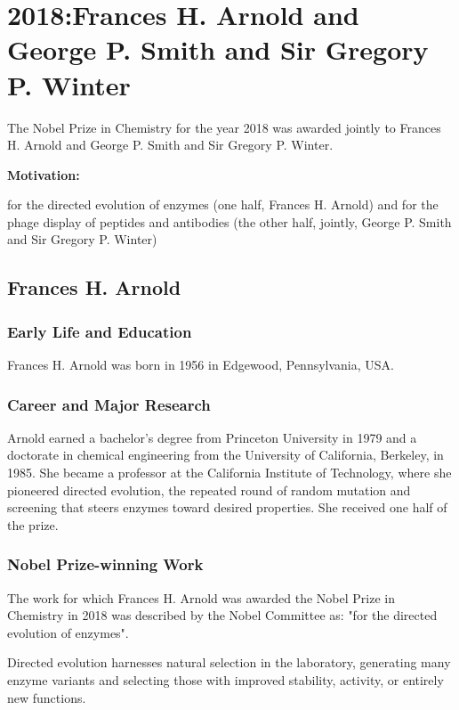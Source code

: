 \chapter{2018:Frances H. Arnold and George P. Smith and Sir Gregory P. Winter}

\label{chap:chemistry2018}

The Nobel Prize in Chemistry for the year 2018 was awarded jointly to Frances H. Arnold and George P. Smith and Sir Gregory P. Winter.

\textbf{Motivation:}

for the directed evolution of enzymes (one half, Frances H. Arnold) and for the phage display of peptides and antibodies (the other half, jointly, George P. Smith and Sir Gregory P. Winter)

\section{Frances H. Arnold}

\subsection*{Early Life and Education}

Frances H. Arnold was born in 1956 in Edgewood, Pennsylvania, USA.

\subsection*{Career and Major Research}

Arnold earned a bachelor's degree from Princeton University in 1979 and a doctorate in chemical engineering from the University of California, Berkeley, in 1985. She became a professor at the California Institute of Technology, where she pioneered directed evolution, the repeated round of random mutation and screening that steers enzymes toward desired properties. She received one half of the prize.

\subsection*{Nobel Prize-winning Work}

The work for which Frances H. Arnold was awarded the Nobel Prize in Chemistry in 2018 was described by the Nobel Committee as: "for the directed evolution of enzymes".

Directed evolution harnesses natural selection in the laboratory, generating many enzyme variants and selecting those with improved stability, activity, or entirely new functions.

